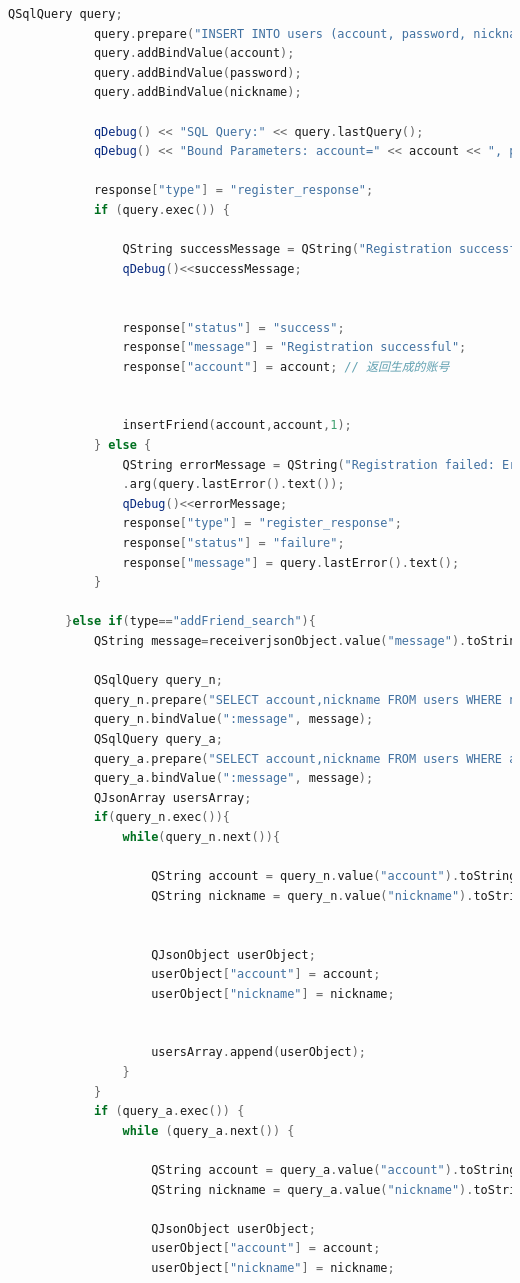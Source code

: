 \documentclass[UTF8]{ctexart}
\begin{document}
\begin{lstlisting}[language=C++, caption=服务端接受信息并处理]
			QSqlQuery query;
			query.prepare("INSERT INTO users (account, password, nickname) VALUES (?, ?, ?)");
			query.addBindValue(account);
			query.addBindValue(password);
			query.addBindValue(nickname);
			
			qDebug() << "SQL Query:" << query.lastQuery();
			qDebug() << "Bound Parameters: account=" << account << ", password=" << password << ", nickname=" << nickname;
			
			response["type"] = "register_response";
			if (query.exec()) {
				
				QString successMessage = QString("Registration successful: Account: %1, Nickname: %2").arg(account, nickname);
				qDebug()<<successMessage;
				
				
				response["status"] = "success";
				response["message"] = "Registration successful";
				response["account"] = account; // 返回生成的账号
				
				
				insertFriend(account,account,1);
			} else {
				QString errorMessage = QString("Registration failed: Error: %1")
				.arg(query.lastError().text());
				qDebug()<<errorMessage;
				response["type"] = "register_response";
				response["status"] = "failure";
				response["message"] = query.lastError().text();
			}
			
		}else if(type=="addFriend_search"){
			QString message=receiverjsonObject.value("message").toString();
			
			QSqlQuery query_n;
			query_n.prepare("SELECT account,nickname FROM users WHERE nickname = :message");
			query_n.bindValue(":message", message);
			QSqlQuery query_a;
			query_a.prepare("SELECT account,nickname FROM users WHERE account = :message");
			query_a.bindValue(":message", message);
			QJsonArray usersArray;
			if(query_n.exec()){
				while(query_n.next()){
					
					QString account = query_n.value("account").toString();
					QString nickname = query_n.value("nickname").toString();
					
					
					QJsonObject userObject;
					userObject["account"] = account;
					userObject["nickname"] = nickname;
					
					
					usersArray.append(userObject);
				}
			}
			if (query_a.exec()) {
				while (query_a.next()) {
					
					QString account = query_a.value("account").toString();
					QString nickname = query_a.value("nickname").toString();
					
					QJsonObject userObject;
					userObject["account"] = account;
					userObject["nickname"] = nickname;
					

\end{lstlisting}
\end{document}
